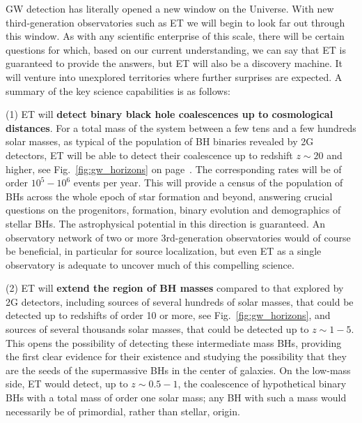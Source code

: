 
GW detection has literally opened a new window on the Universe. With new
third-generation observatories such as ET we will begin to look far out through
this window. As with any scientific enterprise of this scale, there will be
certain questions for which, based on our current understanding, we can say that
ET is guaranteed to provide the answers, but ET will also be a discovery
machine. It will venture into unexplored territories where further surprises are
expected. A summary of the key science capabilities is as follows:

(1)  ET will \textbf{detect binary black hole coalescences up to cosmological distances}.
For a total mass of the system between a few tens and a few hundreds solar
masses, as typical of the population of BH binaries revealed by 2G detectors, ET
will be able to detect their coalescence up to redshift $z\sim 20$ and higher,
see Fig.~\ref{fig:gw_horizons} on page~\pageref{fig:gw_horizons}. The corresponding rates will be of order
$10^5-10^6$ events per year. This  will  provide a census of the population of
BHs across the whole epoch of star formation and beyond, answering crucial
questions on the progenitors, formation, binary evolution and demographics of
stellar BHs. The astrophysical potential in this direction is
guaranteed. An observatory network of two or more 3rd-generation observatories 
would of course be beneficial, in particular for
source localization, but even ET as a single observatory 
is adequate to uncover much of this compelling science.

(2) ET will \textbf{extend the region of BH masses} compared to that explored by 2G detectors, including sources of several hundreds of solar masses, that could be detected up to redshifts of order 10 or more, see Fig.~\ref{fig:gw_horizons}, 
and sources of several thousands solar masses, that could be detected up to $z\sim 1-5$.  
This opens the possibility of detecting  these intermediate mass BHs, providing
the first clear evidence for their existence and  studying the possibility that
they are the seeds of the supermassive BHs in the center of galaxies. On the
low-mass side, ET would detect, up to $z\sim 0.5-1$,  the coalescence of
hypothetical binary BHs with a total mass of order one solar mass; any BH with
such a mass would necessarily be of primordial, rather than stellar, origin.

